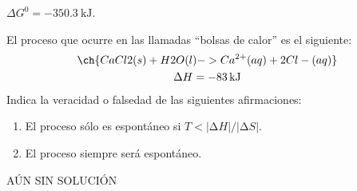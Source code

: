 \documentclass[10pt,a5paper,twoside]{article}
\begin{document}
  \begin{solution}
    \( \Delta G^0 = \SI{-350.3}{\kilo\joule} \).
  \end{solution}




  \begin{exercise}[
      tags    = {termodinámica, espontaneidad, Gibbs},
      topics  = {química, termoquímica, termodinámica},
      source  = {},
    ]
    El proceso que ocurre en las llamadas “bolsas de calor” es el siguiente:
    \begin{multline*}
      \ch{CaCl2(s) + H2O(l) -> Ca^{2+}(aq) + 2 Cl-(aq)} \\
      \Delta H = \SI{-83}{\kilo\joule}
    \end{multline*}
    Indica la veracidad o falsedad de las siguientes afirmaciones:
    \begin{enumerate}
      \item El proceso sólo es espontáneo si \( T < |∆H|/|∆S| \).
      \item El proceso siempre será espontáneo.
    \end{enumerate}

  \end{exercise}

  \begin{solution}
    AÚN SIN SOLUCIÓN %
  \end{solution}
\end{document}
